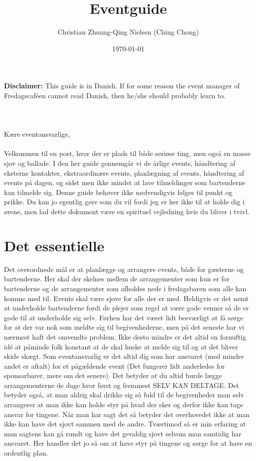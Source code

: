 

\title{Eventguide}
\date{\today}
\author{Christian Zhuang-Qing Nielsen (Ching Chong)}



\maketitle
\noindent\textbf{Disclaimer:} This guide is in Danish. If for some reason the event manager of Fredagscaféen cannot read Danish, then he/she should probably learn to.
\\ \\ \\ \\
\noindent Kære eventansvarlige,
\\ \\
Velkommen til en post, hvor der er plads til både seriøse ting, men også en masse sjov og ballade. I den her guide gennemgår vi de årlige events, håndtering af eksterne kontakter, ekstraordinære events, planlægning af events, håndtering af events på dagen, og sidst men ikke mindst at lave tilmeldinger som bartenderne kan tilmelde sig. Denne guide behøver ikke nødvendigvis følges til punkt og prikke. Du kan jo egentlig gøre som du vil fordi jeg er her ikke til at holde dig i ørene, men lad dette dokument være en spirituel vejledning hvis du bliver i tvivl.

\section*{Det essentielle}
\label{sec:det-essentielle}

Det overordnede mål er at planlægge og arrangere events, både for gæsterne
og bartenderne. Her skal der skelnes mellem de arrangementer som kun er for bartenderne og de arrangementer som afholdes nede i fredagsbaren som alle kan komme med til. Events skal være sjove for alle der er med. Heldigvis er det nemt at underholde bartenderne fordi de plejer som regel at være gode venner så de er gode til at underholde sig selv. Førhen har det været lidt besværligt at få sørge for at der var nok som meldte sig til begivenhederne, men på det seneste har vi nærmest haft det omvendte problem. Ikke desto mindre er det altid en fornuftig idé at påminde folk konstant at de skal huske at melde sig til og at det bliver skide skægt. Som eventansvarlig er det altid dig som har ansvaret (med mindre andet er aftalt) for et pågældende event (Det fungerer lidt anderledes for sponsorbarer, mere om det senere). Det betyder at du altid burde lægge arrangementerne de dage hvor først og fremmest SELV KAN DELTAGE. Det betyder også, at man aldrig skal drikke sig så fuld til de begivenheder man selv arrangerer at man ikke kan holde styr på hvad der sker og derfor ikke kan tage ansvar for tingene. Når man har sagt det så betyder det overhovedet ikke at man ikke kan have det sjovt sammen med de andre. Tværtimod så er min erfaring at man sagtens kan gå rundt og have det gevaldig sjovt selvom man samtidig har ansvaret. Her handler det jo så om at have styr på tingene og sørge for at have en ordentlig plan.


